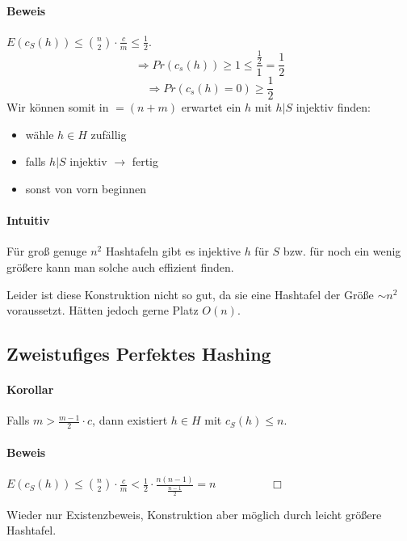 \paragraph*{Beweis} $E(c_S(h)) \leq {n \choose 2} \cdot \frac{c}{m} \leq \frac{1}{2}$.
$$ \Rightarrow Pr(c_s(h)) \geq 1 \leq \frac{\frac{1}{2}}{1} = \frac{1}{2}$$
$$ \Rightarrow Pr(c_s(h)=0) \geq \frac{1}{2}$$
Wir können somit in $=(n+m)$ erwartet ein $h$ mit $h|S$ injektiv finden:
\begin{itemize}
	\item wähle $h \in H$ zufällig
	\item falls $h|S$ injektiv $\rightarrow$ fertig
	\item[] sonst von vorn beginnen
\end{itemize}

\paragraph*{Intuitiv} Für groß genuge $n^2$ Hashtafeln gibt es injektive $h$ für $S$ bzw. für noch ein wenig größere kann man solche auch effizient finden.

\par\medskip
Leider ist diese Konstruktion nicht so gut, da sie eine Hashtafel der Größe $\sim n^2$ voraussetzt. Hätten jedoch gerne Platz $O(n)$.\par\medskip


\subsection{Zweistufiges Perfektes Hashing}

\paragraph*{Korollar} Falls $m > \frac{m-1}{2} \cdot c$, dann existiert $h \in H$ mit $c_S(h) \leq n$.

\paragraph*{Beweis} $E(c_S(h)) \leq {n \choose 2} \cdot \frac{c}{m} < \frac{1}{2} \cdot \frac{n(n-1)}{\frac{n-1}{2}} = n \hspace{2cm} \Box$

\par\medskip
Wieder nur Existenzbeweis, Konstruktion aber möglich durch leicht größere Hashtafel.\par\medskip

